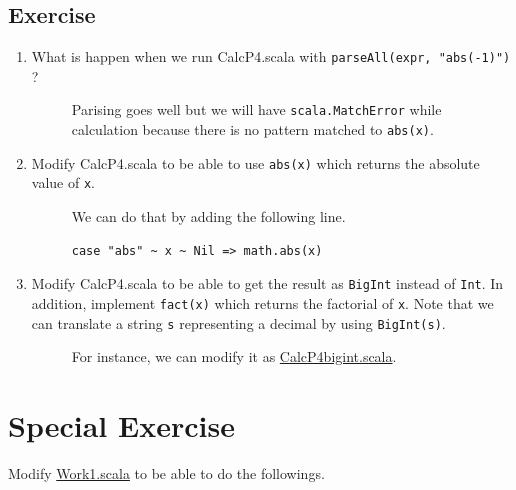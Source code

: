 \documentclass[11pt]{article}
\begin{document}
\subsection{Exercise}
\label{sec:orgheadline10}
\begin{enumerate}
\item What is happen when we run CalcP4.scala with \texttt{parseAll(expr, "abs(-1)")} ?
\begin{description}
\item[{}] Parising goes well but we will have  \texttt{scala.MatchError} while
calculation because there is no pattern matched to \texttt{abs(x)}.
\end{description}
\item Modify CalcP4.scala to be able to use \texttt{abs(x)} which returns the
absolute value of \texttt{x}. 
\begin{description}
\item[{}] We can do that by adding the following line. 
\begin{verbatim}
case "abs" ~ x ~ Nil => math.abs(x)
\end{verbatim}
\end{description}
\item Modify CalcP4.scala to be able to get the result as \texttt{BigInt}
instead of \texttt{Int}. In addition, implement \texttt{fact(x)} which returns
the factorial of \texttt{x}. Note that we can translate a string \texttt{s} 
representing a decimal by using  \texttt{BigInt(s)}. 
\begin{description}
\item[{}] For instance, we can modify it as \href{prog/parser/CalcP4bigint.scala}{CalcP4bigint.scala}.
\end{description}
\end{enumerate}

\section{Special Exercise}
\label{sec:orgheadline13}
Modify \href{prog/parser/Work1.scala}{Work1.scala} to be able to do the followings. 
\end{document}
